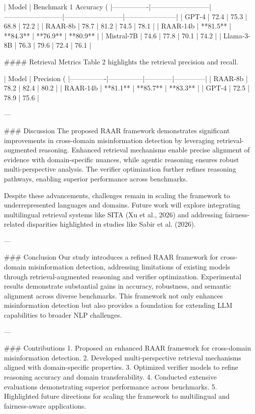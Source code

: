 | Model          | Benchmark 1 Accuracy (%
|----------------|--------------------------|--------------------------|--------------------------|-----------------------|
| GPT-4          | 72.4                    | 75.3                    | 68.8                    | 72.2                 |
| RAAR-8b        | 78.7                    | 81.2                    | 74.5                    | 78.1                 |
| RAAR-14b       | **81.5**                | **84.3**                | **76.9**                | **80.9**             |
| Mistral-7B     | 74.6                    | 77.8                    | 70.1                    | 74.2                 |
| Llama-3-8B     | 76.3                    | 79.6                    | 72.4                    | 76.1                 |

#### Retrieval Metrics
Table 2 highlights the retrieval precision and recall.

| Model          | Precision (%
|----------------|---------------|------------|--------------|
| RAAR-8b        | 78.2          | 82.4       | 80.2         |
| RAAR-14b       | **81.1**      | **85.7**   | **83.3**     |
| GPT-4          | 72.5          | 78.9       | 75.6         |

---

### Discussion
The proposed RAAR framework demonstrates significant improvements in cross-domain misinformation detection by leveraging retrieval-augmented reasoning. Enhanced retrieval mechanisms enable precise alignment of evidence with domain-specific nuances, while agentic reasoning ensures robust multi-perspective analysis. The verifier optimization further refines reasoning pathways, enabling superior performance across benchmarks.

Despite these advancements, challenges remain in scaling the framework to underrepresented languages and domains. Future work will explore integrating multilingual retrieval systems like SITA (Xu et al., 2026) and addressing fairness-related disparities highlighted in studies like Sabir et al. (2026).

---

### Conclusion
Our study introduces a refined RAAR framework for cross-domain misinformation detection, addressing limitations of existing models through retrieval-augmented reasoning and verifier optimization. Experimental results demonstrate substantial gains in accuracy, robustness, and semantic alignment across diverse benchmarks. This framework not only enhances misinformation detection but also provides a foundation for extending LLM capabilities to broader NLP challenges.

---

### Contributions
1. Proposed an enhanced RAAR framework for cross-domain misinformation detection.
2. Developed multi-perspective retrieval mechanisms aligned with domain-specific properties.
3. Optimized verifier models to refine reasoning accuracy and domain transferability.
4. Conducted extensive evaluations demonstrating superior performance across benchmarks.
5. Highlighted future directions for scaling the framework to multilingual and fairness-aware applications.